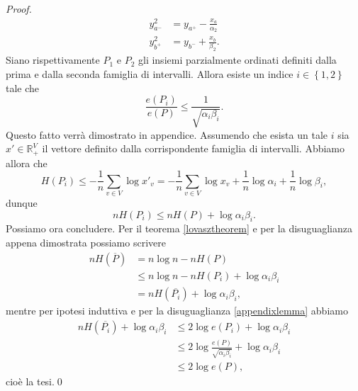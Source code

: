 {\begin{proof}
	\begin{align}
		y_{a^-}^2 &= y_{a^+} - \frac{x_a}{\alpha_2} \nonumber \\
		y_{b^+}^2 &= y_{b^-} + \frac{x_b}{\beta_2}. \nonumber 
	\end{align}
	Siano rispettivamente \(P_1\) e \(P_2\) gli insiemi parzialmente ordinati definiti dalla prima e dalla seconda famiglia di intervalli. Allora esiste un indice \(i\in\left\{1,2\right\}\) tale che 
	\begin{equation}
		\label{appendixlemma} \frac{e(P_i)}{e(P)}\le\frac{1}{\sqrt{\alpha_i\beta_i}}. 
	\end{equation}
	Questo fatto verrà dimostrato in appendice. Assumendo che esista un tale \(i\) sia \(x'\in\mathbb{R}_{+}^V\) il vettore definito dalla corrispondente famiglia di intervalli. Abbiamo allora che
	\[H(P_i)\le-\frac{1}{n}\sum_{v\in V}{\log{x'_v}=-\frac{1}{n}\sum_{v\in V}{\log{x_v}}+\frac{1}{n}\log{\alpha_i}+\frac{1}{n}\log{\beta_i}},\]
	dunque
	\[nH(P_i)\le nH(P)+\log{\alpha_i\beta_i}.\]
	Possiamo ora concludere. Per il teorema \ref{lovasztheorem} e per la disuguaglianza appena dimostrata possiamo scrivere 
	\begin{align}
		nH(\overline{P}) &= n\log{n}-nH(P) \nonumber \\
		&\le n\log{n}-nH(P_i)+\log{\alpha_i\beta_i} \nonumber \\
		&= nH(\overline{P_i})+\log{\alpha_i\beta_i}, \nonumber 
	\end{align}
	mentre per ipotesi induttiva e per la disuguaglianza \ref{appendixlemma} abbiamo 
	\begin{align}
		nH(\overline{P_i})+\log{\alpha_i\beta_i} &\le 2\log{e(P_i)}+\log{\alpha_i\beta_i} \nonumber \\
		&\le 2\log{\frac{e(P)}{\sqrt{\alpha_i\beta_i}}}+\log{\alpha_i\beta_i} \nonumber \\
		&\le 2\log{e(P)}, \nonumber 
	\end{align}
	cioè la tesi.\qed 
\end{proof}

}
